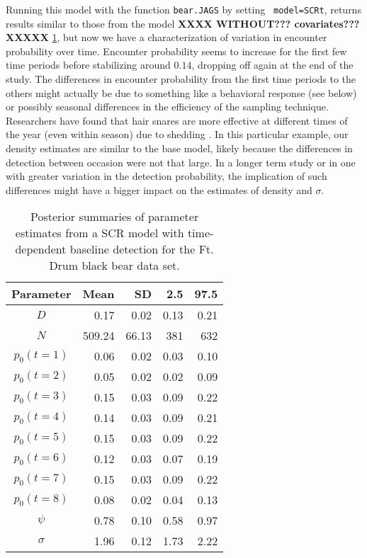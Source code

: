 Running this model with the function {\tt bear.JAGS} by setting {\tt
  model=SCRt}, returns results similar to those from the model {\bf
  XXXX WITHOUT??? covariates??? XXXXX} \ref{covariates.tab.SCRt}, but
now we have a characterization of variation in encounter probability
over time.  Encounter probability seems to increase for the first few
time periods before stabilizing around $0.14$, dropping off again at
the end of the study.  The differences in encounter probability from
the first time periods to the others might actually be due to
something like a behavioral response (see below) or possibly seasonal
differences in the efficiency of the sampling technique.  Researchers
have found that hair snares are more effective at different times of
the year (even within season) due to shedding
\citep{wegan_etal:inpress}.  In this particular example, our density
estimates are similar to the base model, likely because the
differences in detection between occasion were not that large.  In a
longer term study or in one with greater variation in the detection
probability, the implication of such differences might have a bigger
impact on the estimates of density and $\sigma$.

\begin{table}[ht]
\centering
\caption{Posterior summaries of parameter estimates from a SCR model with time-dependent baseline detection for the Ft. Drum black bear data set.}
\begin{tabular}{crrrr}
\hline
Parameter & Mean & SD & 2.5 & 97.5 \\
\hline
$D$           &    0.17     &  0.02    & 0.13 & 0.21 \\
$N$           &   509.24 &  66.13  & 381  & 632  \\
$p_0 (t=1)$  &    0.06     & 0.02     & 0.03  & 0.10  \\
$p_0 (t=2)$  &    0.05  & 0.02  &      0.02 & 0.09  \\
$p_0 (t=3)$  &    0.15 &  0.03  &     0.09 & 0.22  \\
$p_0 (t=4)$  &    0.14 &  0.03  &     0.09 & 0.21  \\
$p_0 (t=5)$  &    0.15 &  0.03  &    0.09 &  0.22  \\
$p_0 (t=6)$  &    0.12 &  0.03  &    0.07 & 0.19  \\
$p_0 (t=7)$  &    0.15 &  0.03  &    0.09 & 0.22  \\
$p_0 (t=8)$  &    0.08 &  0.02  &    0.04 & 0.13  \\
$\psi$  &   0.78 &  0.10  &  0.58 & 0.97  \\
$\sigma$ & 1.96 &  0.12  &   1.73 & 2.22  \\
\end{tabular}
\label{covariates.tab.SCRt}
\end{table}

